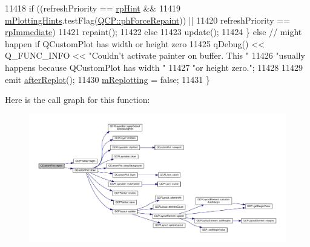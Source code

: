 \begin{DoxyCode}
11418     \textcolor{keywordflow}{if} ((refreshPriority == \hyperlink{class_q_custom_plot_a45d61392d13042e712a956d27762aa39adfa1f2387617168d9299f4c8ad15b332}{rpHint} &&
11419          \hyperlink{class_q_custom_plot_aa184197a6101a9cc5807469e1d006c9e}{mPlottingHints}.testFlag(\hyperlink{namespace_q_c_p_a5400e5fcb9528d92002ddb938c1f4ef4aa3090dafa0e0f9a28c579c79d6c2d283}{QCP::phForceRepaint})) ||
11420         refreshPriority == \hyperlink{class_q_custom_plot_a45d61392d13042e712a956d27762aa39a0d4831572370d871f2b7cb88806bac59}{rpImmediate})
11421       repaint();
11422     \textcolor{keywordflow}{else}
11423       update();
11424   \} \textcolor{keywordflow}{else} \textcolor{comment}{// might happen if QCustomPlot has width or height zero}
11425     qDebug() << Q\_FUNC\_INFO << \textcolor{stringliteral}{"Couldn't activate painter on buffer. This "}
11426                                \textcolor{stringliteral}{"usually happens because QCustomPlot has width "}
11427                                \textcolor{stringliteral}{"or height zero."};
11428 
11429   emit \hyperlink{class_q_custom_plot_a6f4fa624af060bc5919c5f266cf426a0}{afterReplot}();
11430   \hyperlink{class_q_custom_plot_ab30daeca6612c3948afd368dce5f1c39}{mReplotting} = \textcolor{keyword}{false};
11431 \}
\end{DoxyCode}


Here is the call graph for this function\+:\nopagebreak
\begin{figure}[H]
\begin{center}
\leavevmode
\includegraphics[width=350pt]{class_q_custom_plot_a606fd384b2a637ce2c24899bcbde77d6_cgraph}
\end{center}
\end{figure}




